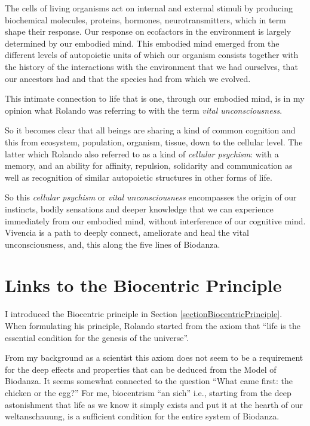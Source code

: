 \documentclass[
  11pt,
]{book}
\begin{document}
The cells of living organisms act on internal and external stimuli by producing biochemical molecules, proteins, hormones, neurotransmitters, which in term shape their response.
Our response on ecofactors in the environment is largely determined by our embodied mind. This embodied mind emerged from the different levels of autopoietic units of which our organism consists together with the history of the interactions with the environment that we had ourselves, that our ancestors had and that the species had from which we evolved.

This intimate connection to life that is one, through our embodied mind, is in my opinion what Rolando was referring to with the term \emph{vital unconsciousness}.

So it becomes clear that all beings are sharing a kind of common cognition and this from ecosystem, population, organism, tissue, down to the cellular level. The latter which Rolando also referred to as a kind of \emph{cellular psychism}: with a memory, and an ability for affinity, repulsion, solidarity and communication as well as recognition of similar autopoietic structures in other forms of life.

So this \emph{cellular psychism} or \emph{vital unconsciousness} encompasses the origin of our instincts, bodily sensations and deeper knowledge that we can experience immediately from our embodied mind, without interference of our cognitive mind. Vivencia is a path to deeply connect, ameliorate and heal the vital unconsciousness, and, this along the five lines of Biodanza.

\hypertarget{links-to-the-biocentric-principle}{%
\section{Links to the Biocentric Principle}\label{links-to-the-biocentric-principle}}

I introduced the Biocentric principle in Section \ref{sectionBiocentricPrinciple}. When formulating his principle, Rolando started from the axiom that ``life is the essential condition for the genesis of the universe''.

From my background as a scientist this axiom does not seem to be a requirement for the deep effects and properties that can be deduced from the Model of Biodanza. It seems somewhat connected to the question ``What came first: the chicken or the egg?'' For me, biocentrism ``an sich'' i.e., starting from the deep astonishment that life as we know it simply exists and put it at the hearth of our weltanschauung, is a sufficient condition for the entire system of Biodanza.
\end{document}
